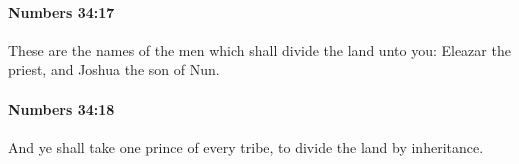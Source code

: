		\paragraph{Numbers 34:17} %
			\label{NUMBERS-34-17}

			These are the names of the men which shall divide the land unto you: Eleazar the priest, and Joshua the son of Nun.


		\paragraph{Numbers 34:18} %
			\label{NUMBERS-34-18}

			And ye shall take one prince of every tribe, to divide the land by inheritance.


